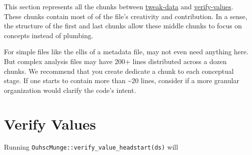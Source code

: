 \documentclass[
]{book}
\begin{document}
This section represents all the chunks between \protect\hyperlink{chunk-tweak-data}{tweak-data} and \protect\hyperlink{chunk-verify-values}{verify-values}. These chunks contain most of of the file's creativity and contribution. In a sense, the structure of the first and last chunks allow these middle chunks to focus on concepts instead of plumbing.

For simple files like the ellis of a metadata file, may not even need anything here. But complex analysis files may have 200+ lines distributed across a dozen chunks. We recommend that you create dedicate a chunk to each conceptual stage. If one starts to contain more than \textasciitilde20 lines, consider if a more granular organization would clarify the code's intent.

\hypertarget{chunk-verify-values}{%
\section{Verify Values}\label{chunk-verify-values}}

Running \texttt{OuhscMunge::verify\_value\_headstart(ds)} will
\end{document}
